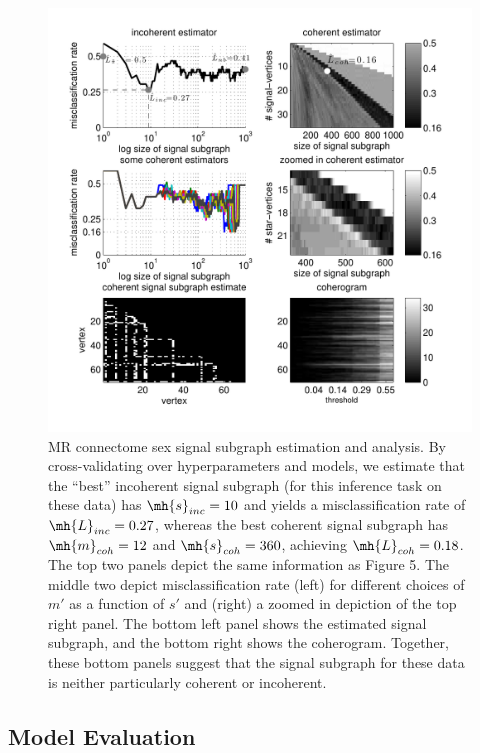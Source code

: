 \documentclass[10pt,journal,cspaper,compsoc]{IEEEtran}
\begin{document}


\begin{figure}[htbp]
	\centering
		\includegraphics[width=1.0\linewidth]{../figs/BLSA0317_Count_Lhats_results.pdf}
	\caption{MR connectome sex signal subgraph estimation and analysis. By cross-validating over hyperparameters and models, we estimate that the ``best'' incoherent signal subgraph (for this inference task on these data) has $\mh{s}_{inc}=10$ and yields a misclassification rate of $\mh{L}_{inc}=0.27$, whereas the best coherent signal subgraph has $\mh{m}_{coh}=12$ and $\mh{s}_{coh}=360$, achieving $\mh{L}_{coh}=0.18$.  The top two panels depict the same information as Figure 5.  The middle two depict misclassification rate (left) for different choices of $m'$ as a function of $s'$ and (right) a zoomed in depiction of the top right panel. The bottom left panel shows the estimated signal subgraph, and the bottom right shows the coherogram.  Together, these bottom panels suggest that the signal subgraph for these data is neither particularly coherent or incoherent.}
	\label{fig:data}
\end{figure}

\subsection{Model Evaluation} %
\label{sub:model_checking}
\end{document}
